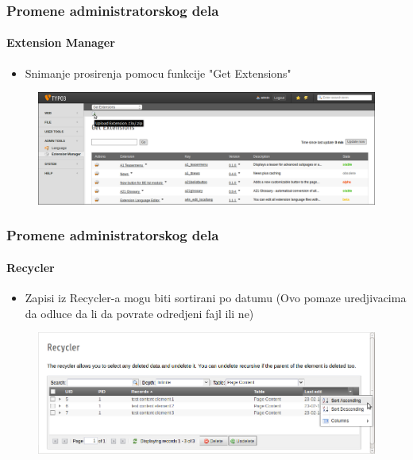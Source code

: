 
\begin{frame}[fragile]
	\frametitle{Promene administratorskog dela}
	\framesubtitle{Extension Manager}

 	\begin{itemize}
		\item Snimanje prosirenja pomocu funkcije "Get Extensions"
	\end{itemize}

	\begin{figure}
		\includegraphics[width=0.95\linewidth]{Images/BackendChanges/UploadExtension.png}
	\end{figure}

\end{frame}


\begin{frame}[fragile]
	\frametitle{Promene administratorskog dela}
	\framesubtitle{Recycler}

 	\begin{itemize}
		\item Zapisi iz Recycler-a mogu biti sortirani po datumu\newline
			\small(Ovo pomaze uredjivacima da odluce da li da povrate odredjeni fajl ili ne)\normalsize
	\end{itemize}

	\begin{figure}
		\includegraphics[width=0.95\linewidth]{Images/BackendChanges/RecyclerSortRecord.png}
	\end{figure}

\end{frame}

